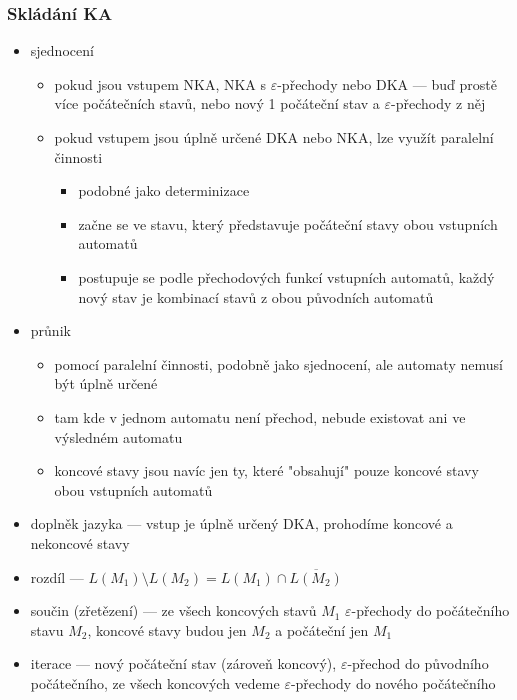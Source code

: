 \subsubsection*{Skládání KA}
\begin{itemize}
	\item sjednocení
	\begin{itemize}
		\item pokud jsou vstupem NKA, NKA s $\varepsilon$-přechody nebo DKA --- buď prostě více počátečních stavů, nebo nový 1 počáteční stav a $\varepsilon$-přechody z něj
		\item pokud vstupem jsou úplně určené DKA nebo NKA, lze využít paralelní činnosti
		\begin{itemize}
			\item podobné jako determinizace
			\item začne se ve stavu, který představuje počáteční stavy obou vstupních automatů
			\item postupuje se podle přechodových funkcí vstupních automatů, každý nový stav je kombinací stavů z obou původních automatů
		\end{itemize}
	\end{itemize}
	\item průnik
	\begin{itemize}
		\item pomocí paralelní činnosti, podobně jako sjednocení, ale automaty nemusí být úplně určené
		\item tam kde v jednom automatu není přechod, nebude existovat ani ve výsledném automatu
		\item koncové stavy jsou navíc jen ty, které "obsahují" pouze koncové stavy obou vstupních automatů
	\end{itemize}
	\item doplněk jazyka --- vstup je úplně určený DKA, prohodíme koncové a nekoncové stavy
	\item rozdíl --- $L(M_1) \setminus L(M_2) = L(M_1) \cap \overline{L(M_2)}$
	\item součin (zřetězení) --- ze všech koncových stavů $M_1$ $\varepsilon$-přechody do počátečního stavu $M_2$, koncové stavy budou jen $M_2$ a počáteční jen $M_1$
	\item iterace --- nový počáteční stav (zároveň koncový), $\varepsilon$-přechod do původního počátečního, ze všech koncových vedeme $\varepsilon$-přechody do nového počátečního
\end{itemize}

